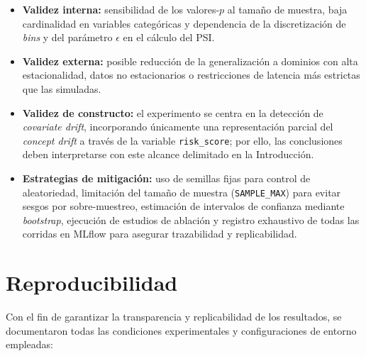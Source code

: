 \begin{itemize}
  \item \textbf{Validez interna:} sensibilidad de los valores-$p$ al tamaño de muestra, baja cardinalidad en variables categóricas y dependencia de la discretización de \textit{bins} y del parámetro $\epsilon$ en el cálculo del PSI.
  \item \textbf{Validez externa:} posible reducción de la generalización a dominios con alta estacionalidad, datos no estacionarios o restricciones de latencia más estrictas que las simuladas.
  \item \textbf{Validez de constructo:} el experimento se centra en la detección de \textit{covariate drift}, incorporando únicamente una representación parcial del \textit{concept drift} a través de la variable \texttt{risk\_score}; por ello, las conclusiones deben interpretarse con este alcance delimitado en la Introducción.
  \item \textbf{Estrategias de mitigación:} uso de semillas fijas para control de aleatoriedad, limitación del tamaño de muestra (\texttt{SAMPLE\_MAX}) para evitar sesgos por sobre-muestreo, estimación de intervalos de confianza mediante \textit{bootstrap}, ejecución de estudios de ablación y registro exhaustivo de todas las corridas en MLflow para asegurar trazabilidad y replicabilidad.
\end{itemize}

\section{Reproducibilidad}
\label{subsec:eval-reprod}

Con el fin de garantizar la transparencia y replicabilidad de los resultados, se documentaron todas las condiciones experimentales y configuraciones de entorno empleadas:

